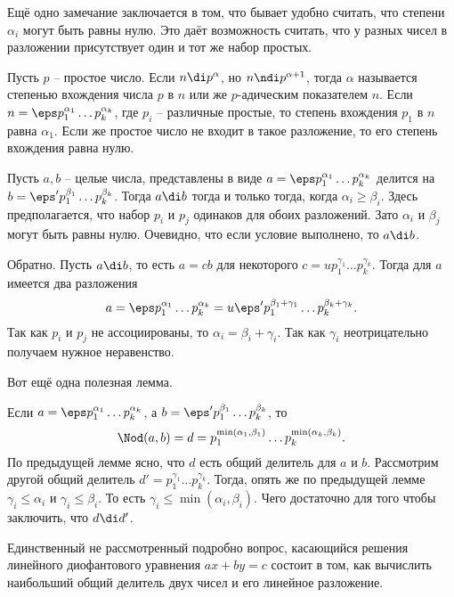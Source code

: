 \rm Ещё одно замечание заключается в том, что бывает удобно считать, что степени $\alpha_i$ могут быть равны нулю. Это даёт возможность считать, что у разных чисел в разложении присутствует один и тот же набор простых. 
 \erm

\rm Пусть $p$ -- простое число. Если  $n \di p^{\alpha}$, но $n\ndi p^{\alpha+1}$, тогда $\alpha$ называется степенью вхождения числа $p$ в $n$ или же $p$-адическим  показателем $n$.
Если $n=\eps p_1^{\alpha_1}\dots p_k^{\alpha_k}$, где $p_i$ -- различные простые, то степень вхождения $p_1$ в $n$ равна $\alpha_1$. Если же простое число не входит в такое разложение, то его степень вхождения равна нулю.
\erm



\lm Пусть $a,b$ -- целые числа, представлены  в виде $a=\eps p_1^{\alpha_1}\dots p_k^{\alpha_k}$ делится на $b=\eps' p_1^{\beta_1}\dots p_k^{\beta_k}$. Тогда $a\di b$ тогда и только тогда, когда $\alpha_i\geq \beta_i$. Здесь предполагается, что набор $p_i$ и $p_j$  одинаков для обоих разложений. Зато $\alpha_i$ и $\beta_j$ могут быть равны нулю.
\proof Очевидно, что если условие выполнено, то $a\di b$. 

Обратно. Пусть $a\di b$, то есть $a=cb$ для некоторого $c=up_1^{\gamma_1}\dots p_k^{\gamma_k}$. Тогда для $a$ имеется два разложения
$$a=\eps p_1^{\alpha_1}\dots p_k^{\alpha_k}=u\eps'p_1^{\beta_1+\gamma_1}\dots p_k^{\beta_k+\gamma_k}.$$
Так как $p_i$ и $p_j$ не ассоциированы, то $\alpha_i=\beta_i+\gamma_i$. Так как $\gamma_i$ неотрицательно получаем нужное неравенство.
\endproof
\elm

Вот ещё одна полезная лемма.

\lm Если $a=\eps p_1^{\alpha_1}\dots p_k^{\alpha_k}$, а $b=\eps' p_1^{\beta_1}\dots p_k^{\beta_k}$, то $$\Nod(a,b)=d=p_1^{\min(\alpha_1,\beta_1)}\dots p_k^{\min(\alpha_k,\beta_k)}.$$
\proof
По предыдущей лемме ясно, что $d$ есть общий делитель для $a$ и $b$. Рассмотрим другой общий делитель $d'=p_1^{\gamma_1}\dots p_k^{\gamma_k}$. Тогда, опять же по предыдущей лемме $\gamma_i\leq \alpha_i$ и $\gamma_i\leq \beta_i$. То есть $\gamma_i \leq \min(\alpha_i, \beta_i)$. Чего достаточно для того чтобы заключить, что $d\di d'$.
\endproof
\elm









Единственный не рассмотренный подробно вопрос, касающийся решения  линейного диофантового уравнения $ax+by=c$ состоит в том, как вычислить наибольший общий делитель двух чисел и его линейное разложение.

